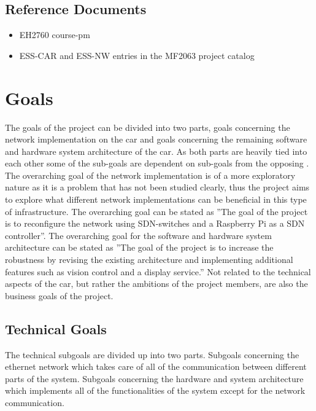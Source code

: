 \documentclass[11pt, titlepage]{article} %
\begin{document}
\subsection*{Reference Documents}
\begin{itemize}
    \item EH2760 course-pm \cite{eh2760_pm}
    \item ESS-CAR and ESS-NW entries in the MF2063 project catalog
        \cite{projects}
\end{itemize}

\section{Goals}
The goals of the project can be divided into two parts, goals concerning
the network implementation on the car and goals concerning the remaining
software and hardware system architecture of the car. As both parts are
heavily tied into each other some of the sub-goals are dependent on
sub-goals from the opposing . The overarching goal of the network
implementation is of a more exploratory nature as it is a problem that has
not been studied clearly, thus the project aims to explore what different
network implementations can be beneficial in this type of infrastructure.
The overarching goal can be stated as ''The goal of the project is to
reconfigure the network using SDN-switches and a Raspberry Pi as a SDN
controller''. The overarching goal for the software and hardware system
architecture can be stated as ''The goal of the project is to increase the
robustness by revising the existing architecture and implementing
additional features such as vision control and a display service.''  Not
related to the technical aspects of the car, but rather the ambitions of
the project members, are also the business goals of the project.

\subsection{Technical Goals}
The technical subgoals are divided up into two parts. Subgoals concerning
the ethernet network which takes care of all of the communication between
different parts of the system. Subgoals concerning the hardware and system
architecture which implements all of the functionalities of the system
except for the network communication.
\end{document}

